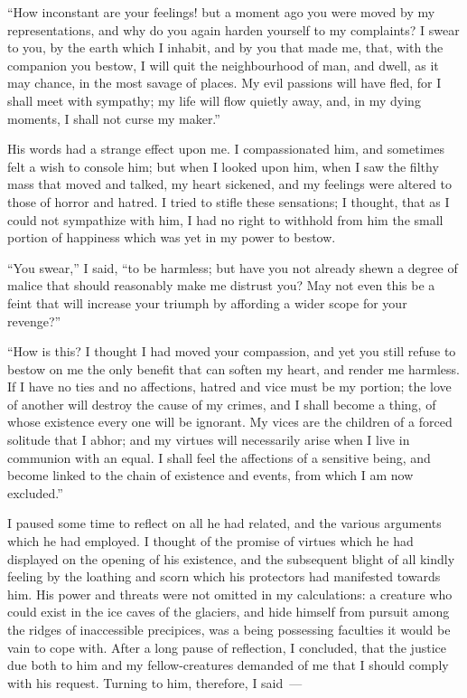 ``How inconstant are your feelings!
but a moment ago you were moved by
my representations, and why do you
again harden yourself to my
complaints? I swear to you, by the earth
which I inhabit, and by you that made
me, that, with the companion you
bestow, I will quit the neighbourhood
of man, and dwell, as it may
chance, in the most savage of places.
My evil passions will have fled, for
I shall meet with sympathy; my life
will flow quietly away, and, in my
dying moments, I shall not curse my
maker.''

His words had a strange effect upon
me. I compassionated him, and sometimes
felt a wish to console him; but
when I looked upon him, when I saw
the filthy mass that moved and talked,
my heart sickened, and my feelings
were altered to those of horror and
hatred. I tried to stifle these sensations;
I thought, that as I could not
sympathize with him, I had no right to
withhold from him the small portion of
happiness which was yet in my power
to bestow.

``You swear,'' I said, ``to be harmless;
but have you not already shewn a
degree of malice that should reasonably
make me distrust you? May not
even this be a feint that will increase
your triumph by affording a wider
scope for your revenge?''

``How is this? I thought I had
moved your compassion, and yet you
still refuse to bestow on me the only
benefit that can soften my heart, and
render me harmless. If I have no
ties and no affections, hatred and vice
must be my portion; the love of another
will destroy the cause of my crimes,
and I shall become a thing, of whose
existence every one will be ignorant.
My vices are the children of a forced
solitude that I abhor; and my virtues
will necessarily arise when I live in
communion with an equal. I shall
feel the affections of a sensitive being,
and become linked to the chain of existence
and events, from which I am
now excluded.''

I paused some time to reflect on all
he had related, and the various arguments
which he had employed. I
thought of the promise of virtues which
he had displayed on the opening of his
existence, and the subsequent blight of
all kindly feeling by the loathing and
scorn which his protectors had manifested
towards him. His power and
threats were not omitted in my calculations:
a creature who could exist in
the ice caves of the glaciers, and hide
himself from pursuit among the ridges
of inaccessible precipices, was a being
possessing faculties it would be vain to
cope with. After a long pause of reflection,
I concluded, that the justice
due both to him and my fellow-creatures
demanded of me that I should
comply with his request. Turning to
him, therefore, I said~---

